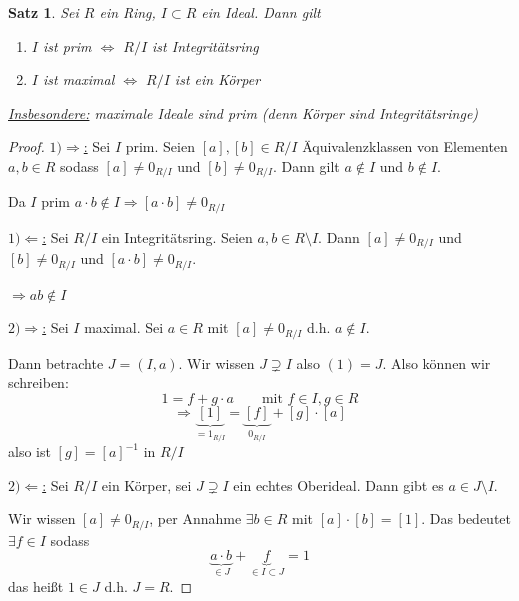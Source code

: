 \documentclass[a4paper,12pt,numbers=noenddot,parskip=full]{scrartcl}
\newcommand{\heading}{\underline}
\theoremstyle{dotless}
\newtheorem{theorem}{Satz}[section]
\theoremstyle{remark}
\begin{document}
	\begin{theorem}
		Sei $R$ ein Ring, $I \subset R$ ein Ideal. Dann gilt
		\begin{enumerate}
			\item $I$ ist prim $\Leftrightarrow$ $R/I$ ist Integritätsring
			\item $I$ ist maximal $\Leftrightarrow$ $R/I$ ist ein Körper
		\end{enumerate}
		\heading {Insbesondere:} maximale Ideale sind prim (denn Körper sind Integritätsringe)
	\end{theorem}

	\begin{proof}
		\heading{$1) \Rightarrow$:} Sei $I$ prim. Seien $[a],[b] \in R/I$ Äquivalenzklassen von Elementen $a,b \in R$ sodass $[a] \neq 0_{R/I}$ und $[b] \neq 0_{R/I}$. Dann gilt $a \notin I$ und $b \notin I$.
		
		Da $I$ prim $a \cdot b \notin I \Rightarrow [a \cdot b] \neq 0_{R/I}$
		
		\heading{$1) \Leftarrow$:} Sei $R/I$ ein Integritätsring. Seien $a,b \in R \setminus I$. Dann $[a] \neq 0_{R/I}$ und $[b] \neq 0_{R/I}$ und $[a \cdot b] \neq 0_{R/I}$.
		
		$\Rightarrow a b \notin I$
		
		\heading{$2) \Rightarrow$:} Sei $I$ maximal. Sei $a \in R$ mit $[a] \neq 0_{R/I}$ d.h. $a \notin I$.
		
		Dann betrachte $J = (I, a)$. Wir wissen $J \supsetneq I$ also $(1) = J$. Also können wir schreiben:
		\begin{equation*}
			1 = f + g \cdot a \qquad \text{mit $f \in I, g \in R$}
		\end{equation*}
		\begin{equation*}
			\Rightarrow \underbrace{[1]}_{=1_{R/I}} = \underbrace{[f]}_{0_{R/I}} + [g] \cdot [a]
		\end{equation*}
		also ist $[g] = [a]^{-1}$ in $R/I$
		
		\heading{$2) \Leftarrow$:} Sei $R/I$ ein Körper, sei $J \supsetneq I$ ein echtes Oberideal. Dann gibt es $a \in J \setminus I$.
		
		Wir wissen $[a] \neq 0_{R/I}$, per Annahme $\exists b \in R$ mit $[a] \cdot [b] = [1]$. Das bedeutet $\exists f \in I$ sodass
		\begin{equation*}
			\underbrace{a \cdot b}_{\in J} + \underbrace{f}_{\in I \subset J} = 1
		\end{equation*}
		das heißt $1 \in J$ d.h. $J = R$.
	\end{proof}
\end{document}
